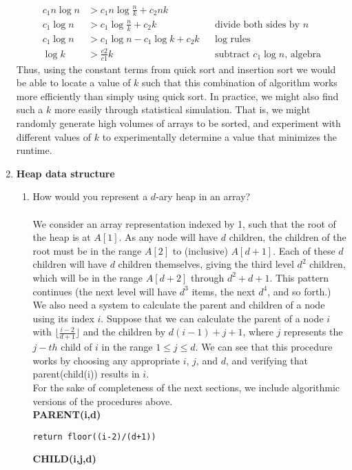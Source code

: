 \documentclass{article}
\begin{document}
\begin{enumerate}
\begin{align}
	c_1 n \log n &>c_1 n \log \frac{n}{k} + c_2 nk  && \text{} \\
	c_1 \log n &> c_1 \log \frac{n}{k} + c_2 k && \text{divide both sides by $n$} \\
	c_1 \log n &> c_1 \log n - c_1\log k + c_2 k && \text{log rules} \\
	\log k &> \frac{c2}{c1} k && \text{subtract $c_1 \log n$, algebra}
	\end{align}
	Thus, using the constant terms from quick sort and insertion sort we would be able to locate a value of $k$ such that this combination of algorithm works more efficiently than simply using quick sort. In practice, we might also find such a $k$ more easily through statistical simulation. That is, we might randomly generate high volumes of arrays to be sorted, and experiment with different values of $k$ to experimentally determine a value that minimizes the runtime.
\item \textbf{Heap data structure}
	\begin{enumerate}
		\item How would you represent a $d$-ary heap in an array?
\\\\ We consider an array representation indexed by 1, such that the root of the heap is at $A[1]$. As any node will have $d$ children, the children of the root must be in the range $A[2]$ to (inclusive) $A[d+1]$. Each of these $d$ children will have $d$ children themselves, giving the third level $d^2$ children, which will be in the range $A[d+2]$ through $d^2+d+1$. This pattern continues (the next level will have $d^3$ items, the next $d^4$, and so forth.)
\\ We also need a system to calculate the parent and children of a node using its index $i$. Suppose that we can calculate the parent of a node $i$ with $\lfloor  \frac{i-2}{d+1} \rfloor$ and the children by $d(i-1)+j+1$, where $j$ represents the $j-th$ child of $i$ in the range $1\leq j \leq d$. We can see that this procedure works by choosing any appropriate $i$, $j$, and $d$, and verifying that parent(child(i)) results in $i$.
\\ For the sake of completeness of the next sections, we include algorithmic versions of the procedures above.
\\ \textbf{PARENT(i,d)}
\begin{lstlisting}
return floor((i-2)/(d+1))
\end{lstlisting}
\textbf{CHILD(i,j,d)}
\begin{lstlisting}

\end{lstlisting}
\end{enumerate}
\end{enumerate}
\end{document}
